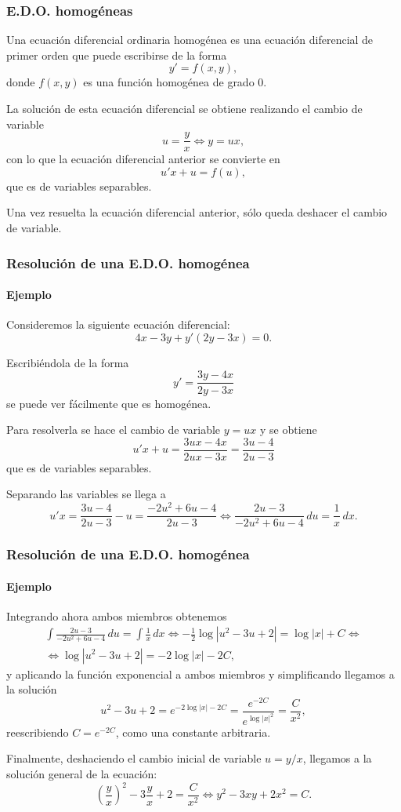 \begin{frame}
\frametitle{E.D.O. homogéneas}
\begin{definicion}[E.D.O. homogénea]
Una ecuación diferencial ordinaria homogénea es una ecuación diferencial de primer orden que puede escribirse de la forma 
\[y'=f(x,y),\]
donde $f(x,y)$ es una función homogénea de grado $0$.
\end{definicion}

La solución de esta ecuación diferencial se obtiene realizando el cambio de variable
\[
u=\frac{y}{x}\Leftrightarrow y=ux,
\]
con lo que la ecuación diferencial anterior se convierte en 
\[
u'x+u=f(u),
\]
que es de variables separables.

Una vez resuelta la ecuación diferencial anterior, sólo queda deshacer el cambio de variable.
\end{frame}


\begin{frame}
\frametitle{Resolución de una E.D.O. homogénea}
\framesubtitle{Ejemplo}
Consideremos la siguiente ecuación diferencial: 
\[
4x-3y+y'(2y-3x)=0.
\]

Escribiéndola de la forma
\[
y'=\frac{3y-4x}{2y-3x}
\]
se puede ver fácilmente que es homogénea.

Para resolverla se hace el cambio de variable $y=ux$ y se obtiene
\[
u'x+u=\frac{3ux-4x}{2ux-3x}=\frac{3u-4}{2u-3}
\]
que es de variables separables.

Separando las variables se llega a
\[
u'x=\frac{3u-4}{2u-3}-u=\frac{-2u^2+6u-4}{2u-3}\Leftrightarrow \frac{2u-3}{-2u^2+6u-4}\,du=\frac{1}{x}\,dx.
\]
\end{frame}


\begin{frame}
\frametitle{Resolución de una E.D.O. homogénea}
\framesubtitle{Ejemplo}
Integrando ahora ambos miembros obtenemos
\[
\renewcommand{\arraystretch}{2}
\begin{array}{c}
\displaystyle \int \frac{2u-3}{-2u^2+6u-4}\,du=\int \frac{1}{x}\,dx
\Leftrightarrow -\frac{1}{2}\log|u^2-3u+2|=\log|x|+C \Leftrightarrow\\
\Leftrightarrow \log|u^2-3u+2|=-2\log|x|-2C,
\end{array}
\]
y aplicando la función exponencial a ambos miembros y simplificando llegamos a la solución 
\[
u^2-3u+2=e^{-2\log|x|-2C}=\frac{e^{-2C}}{e^{\log|x|^2}}=\frac{C}{x^2},
\]
reescribiendo $C=e^{-2C}$, como una constante arbitraria.

Finalmente, deshaciendo el cambio inicial de variable $u=y/x$, llegamos a la solución general de la ecuación:
\[
\left(\frac{y}{x}\right)^2-3\frac{y}{x}+2=\frac{C}{x^2}\Leftrightarrow y^2-3xy+2x^2=C.
\]
\end{frame}



